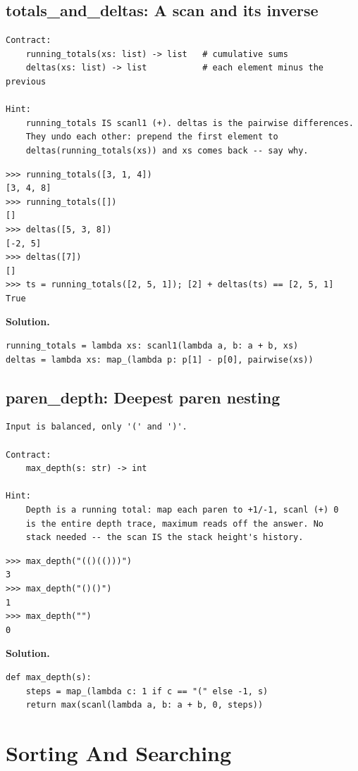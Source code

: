 \documentclass[10pt,letterpaper]{book}
\begin{document}
\section{totals\_and\_deltas: A scan and its inverse}
\begin{lstlisting}[style=ex]
Contract:
    running_totals(xs: list) -> list   # cumulative sums
    deltas(xs: list) -> list           # each element minus the previous

Hint:
    running_totals IS scanl1 (+). deltas is the pairwise differences.
    They undo each other: prepend the first element to
    deltas(running_totals(xs)) and xs comes back -- say why.
\end{lstlisting}
\begin{lstlisting}[style=ex]
>>> running_totals([3, 1, 4])
[3, 4, 8]
>>> running_totals([])
[]
>>> deltas([5, 3, 8])
[-2, 5]
>>> deltas([7])
[]
>>> ts = running_totals([2, 5, 1]); [2] + deltas(ts) == [2, 5, 1]
True
\end{lstlisting}
\noindent\textbf{Solution.}
\begin{lstlisting}[style=code]
running_totals = lambda xs: scanl1(lambda a, b: a + b, xs)
deltas = lambda xs: map_(lambda p: p[1] - p[0], pairwise(xs))
\end{lstlisting}

\section{paren\_depth: Deepest paren nesting}
\begin{lstlisting}[style=ex]
Input is balanced, only '(' and ')'.

Contract:
    max_depth(s: str) -> int

Hint:
    Depth is a running total: map each paren to +1/-1, scanl (+) 0
    is the entire depth trace, maximum reads off the answer. No
    stack needed -- the scan IS the stack height's history.
\end{lstlisting}
\begin{lstlisting}[style=ex]
>>> max_depth("(()(()))")
3
>>> max_depth("()()")
1
>>> max_depth("")
0
\end{lstlisting}
\noindent\textbf{Solution.}
\begin{lstlisting}[style=code]
def max_depth(s):
    steps = map_(lambda c: 1 if c == "(" else -1, s)
    return max(scanl(lambda a, b: a + b, 0, steps))
\end{lstlisting}
\chapter{Sorting And Searching}
\end{document}
